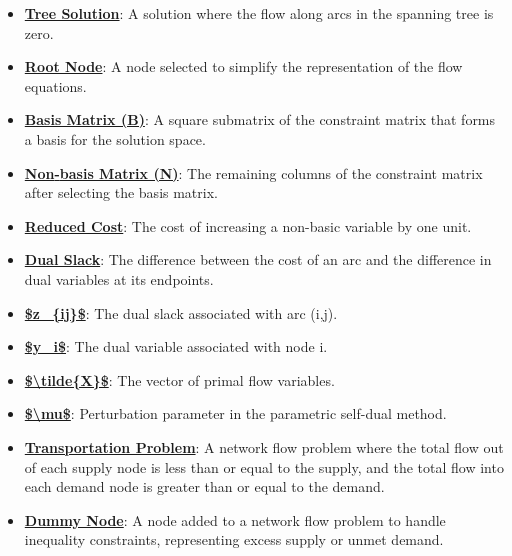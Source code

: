 \documentclass{article}%
\begin{document}
\begin{itemize}[leftmargin=*]
\item \href{https://www.math.purdue.edu/~yipn/421/2024-11-05-NetFlows.pdf#page=11}{\textbf{Tree Solution}}: A solution where the flow along arcs in the spanning tree is zero.%
\item \href{https://www.math.purdue.edu/~yipn/421/2024-11-05-NetFlows.pdf#page=6}{\textbf{Root Node}}: A node selected to simplify the representation of the flow equations.%
\item \href{https://www.math.purdue.edu/~yipn/421/2024-11-05-NetFlows.pdf#page=17}{\textbf{Basis Matrix (B)}}: A square submatrix of the constraint matrix that forms a basis for the solution space.%
\item \href{https://www.math.purdue.edu/~yipn/421/2024-11-05-NetFlows.pdf#page=17}{\textbf{Non{-}basis Matrix (N)}}: The remaining columns of the constraint matrix after selecting the basis matrix.%
\item \href{https://www.math.purdue.edu/~yipn/421/2024-11-05-NetFlows.pdf#page=22}{\textbf{Reduced Cost}}: The cost of increasing a non-basic variable by one unit.%
\item \href{https://www.math.purdue.edu/~yipn/421/2024-11-07-NetSimplex.pdf#page=35}{\textbf{Dual Slack}}: The difference between the cost of an arc and the difference in dual variables at its endpoints.%
\item \href{https://www.math.purdue.edu/~yipn/421/2024-11-07-NetSimplex.pdf#page=3}{\textbf{\$z\_\{ij\}\$}}: The dual slack associated with arc (i,j).%
\item \href{https://www.math.purdue.edu/~yipn/421/2024-11-07-NetSimplex.pdf#page=3}{\textbf{\$y\_i\$}}: The dual variable associated with node i.%
\item \href{https://www.math.purdue.edu/~yipn/421/2024-11-07-NetSimplex.pdf#page=2}{\textbf{\$\textbackslash{}tilde\{X\}\$}}: The vector of primal flow variables.%
\item \href{https://www.math.purdue.edu/~yipn/421/2024-11-07-NetSimplex.pdf#page=45}{\textbf{\$\textbackslash{}mu\$}}: Perturbation parameter in the parametric self-dual method.%
\item \href{https://www.math.purdue.edu/~yipn/421/2024-11-14-NetAppls.pdf#page=1}{\textbf{Transportation Problem}}: A network flow problem where the total flow out of each supply node is less than or equal to the supply, and the total flow into each demand node is greater than or equal to the demand.%
\item \href{https://www.math.purdue.edu/~yipn/421/2024-11-14-NetAppls.pdf#page=3}{\textbf{Dummy Node}}: A node added to a network flow problem to handle inequality constraints, representing excess supply or unmet demand.%

\end{itemize}
\end{document}
